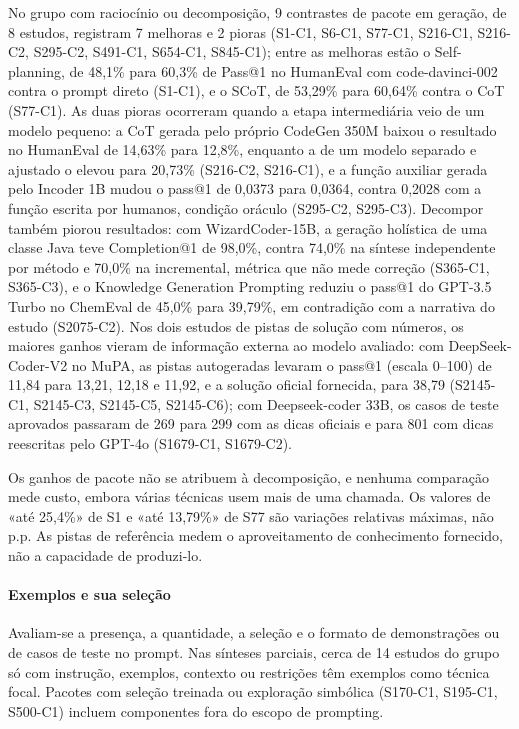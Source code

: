 No grupo com raciocínio ou decomposição, 9 contrastes de pacote em geração, de 8 estudos, registram 7 melhoras e 2 pioras (S1-C1, S6-C1, S77-C1, S216-C1, S216-C2, S295-C2, S491-C1, S654-C1, S845-C1); entre as melhoras estão o Self-planning, de 48,1\% para 60,3\% de Pass@1 no HumanEval com code-davinci-002 contra o prompt direto (S1-C1), e o SCoT, de 53,29\% para 60,64\% contra o CoT (S77-C1).
As duas pioras ocorreram quando a etapa intermediária veio de um modelo pequeno: a CoT gerada pelo próprio CodeGen 350M baixou o resultado no HumanEval de 14,63\% para 12,8\%, enquanto a de um modelo separado e ajustado o elevou para 20,73\% (S216-C2, S216-C1), e a função auxiliar gerada pelo Incoder 1B mudou o pass@1 de 0,0373 para 0,0364, contra 0,2028 com a função escrita por humanos, condição oráculo (S295-C2, S295-C3).
Decompor também piorou resultados: com WizardCoder-15B, a geração holística de uma classe Java teve Completion@1 de 98,0\%, contra 74,0\% na síntese independente por método e 70,0\% na incremental, métrica que não mede correção (S365-C1, S365-C3), e o Knowledge Generation Prompting reduziu o pass@1 do GPT-3.5 Turbo no ChemEval de 45,0\% para 39,79\%, em contradição com a narrativa do estudo (S2075-C2).
Nos dois estudos de pistas de solução com números, os maiores ganhos vieram de informação externa ao modelo avaliado: com DeepSeek-Coder-V2 no MuPA, as pistas autogeradas levaram o pass@1 (escala 0--100) de 11,84 para 13,21, 12,18 e 11,92, e a solução oficial fornecida, para 38,79 (S2145-C1, S2145-C3, S2145-C5, S2145-C6); com Deepseek-coder 33B, os casos de teste aprovados passaram de 269 para 299 com as dicas oficiais e para 801 com dicas reescritas pelo GPT-4o (S1679-C1, S1679-C2).

Os ganhos de pacote não se atribuem à decomposição, e nenhuma comparação mede custo, embora várias técnicas usem mais de uma chamada. Os valores de «até 25,4\%» de S1 e «até 13,79\%» de S77 são variações relativas máximas, não p.p. As pistas de referência medem o aproveitamento de conhecimento fornecido, não a capacidade de produzi-lo.

\paragraph{Exemplos e sua seleção}
Avaliam-se a presença, a quantidade, a seleção e o formato de demonstrações ou de casos de teste no prompt. Nas sínteses parciais, cerca de 14 estudos do grupo só com instrução, exemplos, contexto ou restrições têm exemplos como técnica focal. Pacotes com seleção treinada ou exploração simbólica (S170-C1, S195-C1, S500-C1) incluem componentes fora do escopo de prompting.

